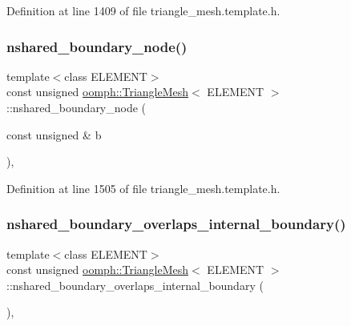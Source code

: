 Definition at line 1409 of file triangle\+\_\+mesh.\+template.\+h.

\mbox{\label{classoomph_1_1TriangleMesh_a4abb5664256467188b28e6390e2c14b8}} 
\subsubsection{\texorpdfstring{nshared\+\_\+boundary\+\_\+node()}{nshared\_boundary\_node()}}
{\footnotesize\ttfamily template$<$class E\+L\+E\+M\+E\+NT$>$ \\
const unsigned \hyperlink{classoomph_1_1TriangleMesh}{oomph\+::\+Triangle\+Mesh}$<$ E\+L\+E\+M\+E\+NT $>$\+::nshared\+\_\+boundary\+\_\+node (\begin{DoxyParamCaption}\item[{const unsigned \&}]{b }\end{DoxyParamCaption})\hspace{0.3cm}{\ttfamily [inline]}, {\ttfamily [protected]}}



Definition at line 1505 of file triangle\+\_\+mesh.\+template.\+h.

\mbox{\label{classoomph_1_1TriangleMesh_a4c18ce8b32cf61d9e79797097383c45b}} 
\subsubsection{\texorpdfstring{nshared\+\_\+boundary\+\_\+overlaps\+\_\+internal\+\_\+boundary()}{nshared\_boundary\_overlaps\_internal\_boundary()}}
{\footnotesize\ttfamily template$<$class E\+L\+E\+M\+E\+NT$>$ \\
const unsigned \hyperlink{classoomph_1_1TriangleMesh}{oomph\+::\+Triangle\+Mesh}$<$ E\+L\+E\+M\+E\+NT $>$\+::nshared\+\_\+boundary\+\_\+overlaps\+\_\+internal\+\_\+boundary (\begin{DoxyParamCaption}{ }\end{DoxyParamCaption})\hspace{0.3cm}{\ttfamily [inline]}, {\ttfamily [protected]}}




